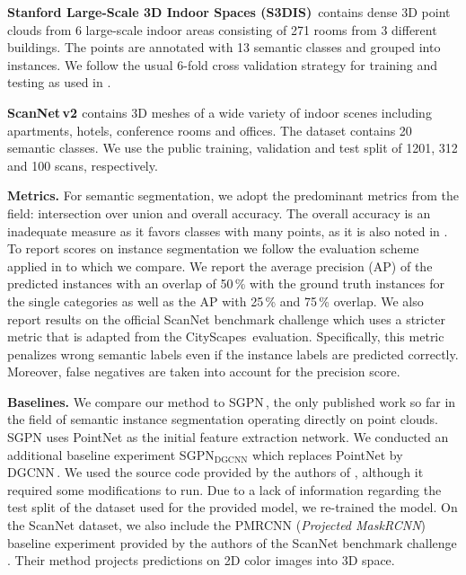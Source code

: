 \documentclass[runningheads]{llncs}
\newcommand{\subsubsubsection}[1]{\vspace{4px} \noindent \textbf{#1}}
\begin{document}
{\subsubsubsection{Stanford Large-Scale 3D Indoor Spaces (S3DIS)\,\cite{Armeni16CVPR}}
contains dense 3D point clouds from 6 large-scale indoor areas consisting of  271 rooms from 3 different buildings.
The points are annotated with 13 semantic classes and grouped into instances.
We follow the usual 6-fold cross validation strategy for training and testing as used in \cite{Qi17CVPR}.

\subsubsubsection{ScanNet\,v2 \cite{Dai17CVPR}} contains 3D meshes of a wide variety of indoor scenes including apartments, hotels, conference rooms and offices.
The dataset contains 20 semantic classes.
We use the public training, validation and test split of 1201, 312 and 100 scans, respectively.

\subsubsubsection{Metrics.}
For semantic segmentation, we adopt the predominant metrics from the field: intersection over union and overall accuracy.
The overall accuracy is an inadequate measure as it favors classes with many points, as it is also noted in \cite{Tatarchenko18CVPR}.
To report scores on instance segmentation we follow the evaluation scheme applied in \cite{Wang18CVPR} to which we compare.
We report the average precision (AP) of the predicted instances with an overlap of 50\,\% with the ground truth instances
for the single categories as well as the AP with 25\,\% and 75\,\% overlap.
We also report results on the official ScanNet benchmark challenge \cite{Dai17ScannetBenchmark}
which uses a stricter metric that is adapted from the CityScapes\,\cite{Cordts16CVPR} evaluation.
Specifically, this metric penalizes wrong semantic labels even if the instance labels are predicted correctly.
Moreover, false negatives are taken into account for the precision score.

\subsubsubsection{Baselines.}
We compare our method to SGPN\,\cite{Wang18CVPR}, the only published work so far in the field of semantic instance segmentation operating directly on point clouds.
SGPN uses PointNet \cite{Qi17CVPR} as the initial feature extraction network.
We conducted an additional  baseline experiment SGPN$_{\text{DGCNN}}$ which replaces PointNet by DGCNN\,\cite{Wang18CoRR}.
We used the source code provided by the authors of \cite{Wang18CVPR}, although it required some modifications to run.
Due to a lack of information regarding the test split of the dataset used for the provided model, we re-trained the model.
On the ScanNet dataset, we also include the PMRCNN (\textit{Projected MaskRCNN}) baseline experiment provided by the authors of the ScanNet benchmark challenge \cite{Dai17ScannetBenchmark}.
Their method projects predictions on 2D color images into 3D space.

}
\end{document}
